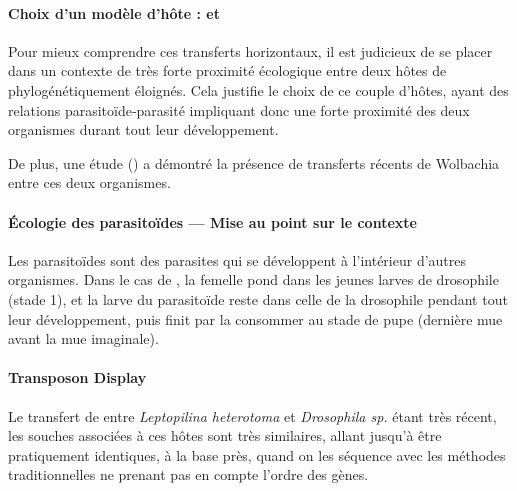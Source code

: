 \paragraph{Choix d’un modèle d’hôte :  et \\}
Pour mieux comprendre ces transferts horizontaux, il est judicieux de se placer dans un contexte de très forte proximité écologique entre deux hôtes de  phylogénétiquement éloignés. Cela justifie le choix de ce couple d’hôtes, ayant des relations parasitoïde‐parasité impliquant donc une forte proximité des deux organismes durant tout leur développement.

De plus, une étude (\cite{vavre1999}) a démontré la présence de transferts récents de Wolbachia entre ces deux organismes.

\begin{encart} %
	\paragraph{Écologie des parasitoïdes --- Mise au point sur le contexte} %
	\label{par:parasitoïdes}
	Les parasitoïdes sont des parasites qui se développent à l’intérieur d’autres organismes. Dans le cas de , la femelle pond dans les jeunes larves de drosophile (stade 1), et la larve du parasitoïde reste dans celle de la drosophile pendant tout leur développement, puis finit par la consommer au stade de pupe (dernière mue avant la mue imaginale).
\end{encart}

\paragraph{Transposon Display\\} %
\label{par:transposon_display}
Le transfert de  entre \textit{Leptopilina heterotoma} et \textit{Drosophila sp.} étant très récent, les souches associées à ces hôtes sont très similaires, allant jusqu’à être pratiquement identiques, à la base près, quand on les séquence avec les méthodes traditionnelles ne prenant pas en compte l’ordre des gènes.

